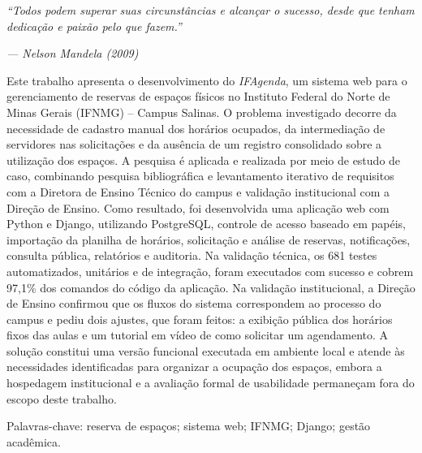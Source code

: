 \documentclass[
	12pt,				%
	oneside,			%
	a4paper,			%
	chapter=TITLE,		%
	section=TITLE,		%
	subsection=TITLE,	%
	subsubsection=TITLE,%
	english,			%
	french,				%
	spanish,			%
	brazil,				%
	]{abntex2}
\begin{document}
\begin{epigrafe}
    \vspace*{\fill}
	\begin{flushright}
		\textit{“Todos podem superar suas circunstâncias e alcançar o sucesso, desde que tenham dedicação e paixão pelo que fazem.”}

		\textit{--- Nelson Mandela (2009)}
	\end{flushright}
\end{epigrafe}

\setlength{\absparsep}{18pt} %

\begin{resumo}
Este trabalho apresenta o desenvolvimento do \textit{IFAgenda}, um sistema web para o gerenciamento de reservas de espaços físicos no Instituto Federal do Norte de Minas Gerais (IFNMG) -- Campus Salinas. O problema investigado decorre da necessidade de cadastro manual dos horários ocupados, da intermediação de servidores nas solicitações e da ausência de um registro consolidado sobre a utilização dos espaços. A pesquisa é aplicada e realizada por meio de estudo de caso, combinando pesquisa bibliográfica e levantamento iterativo de requisitos com a Diretora de Ensino Técnico do campus e validação institucional com a Direção de Ensino. Como resultado, foi desenvolvida uma aplicação web com Python e Django, utilizando PostgreSQL, controle de acesso baseado em papéis, importação da planilha de horários, solicitação e análise de reservas, notificações, consulta pública, relatórios e auditoria. Na validação técnica, os 681 testes automatizados, unitários e de integração, foram executados com sucesso e cobrem 97,1\% dos comandos do código da aplicação. Na validação institucional, a Direção de Ensino confirmou que os fluxos do sistema correspondem ao processo do campus e pediu dois ajustes, que foram feitos: a exibição pública dos horários fixos das aulas e um tutorial em vídeo de como solicitar um agendamento. A solução constitui uma versão funcional executada em ambiente local e atende às necessidades identificadas para organizar a ocupação dos espaços, embora a hospedagem institucional e a avaliação formal de usabilidade permaneçam fora do escopo deste trabalho.

Palavras-chave: reserva de espaços; sistema web; IFNMG; Django; gestão acadêmica.
\end{resumo}
\end{document}
